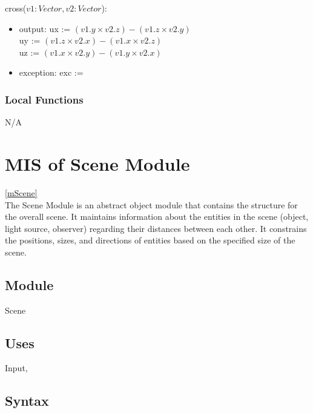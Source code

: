 \documentclass[12pt, titlepage]{article}
\begin{document}
\noindent cross($v1:Vector, v2:Vector$):
\begin{itemize}
	\item output: 
	ux := $(v1.y \times v2.z) - (v1.z \times v2.y)$  \\
	uy := $(v1.z \times v2.x) - (v1.x \times v2.z)$  \\
	uz := $(v1.x \times v2.y) - (v1.y \times v2.x)$  \\
	\item exception: exc := \\
\end{itemize}

\subsubsection{Local Functions}
N/A

\newpage

\section{MIS of Scene Module} \ref{mScene} \\
The Scene Module is an abstract object module that contains the structure for 
the overall scene. It maintains information about the entities in the scene 
(object, light source, observer) regarding their distances between each other. 
It constrains the positions, sizes, and directions of entities based on the 
specified size of the scene.
%
%

\subsection{Module}
Scene

\subsection{Uses}
Input,  

\subsection{Syntax}
\end{document}
